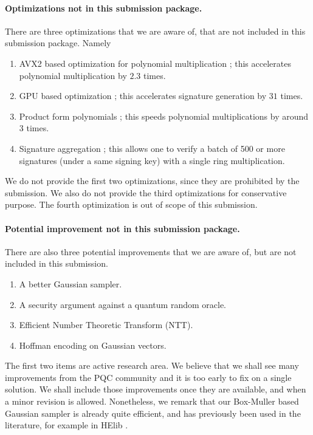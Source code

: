 \documentclass{llncs}
\newcommand{\<}{\langle}
\renewcommand{\>}{\rangle}
\begin{document}
\paragraph{Optimizations not in this submission package.}
There are three optimizations that we are aware of, that are not 
included in this submission package. Namely
\begin{enumerate}


\item AVX2 based optimization for polynomial multiplication \cite{ntrutoc}; this accelerates polynomial multiplication by $2.3$ times.
\item GPU based optimization \cite{DBLP:conf/ieeehpcs/DaiSSWZ16}; this 
accelerates signature generation by $31$ times.
\item Product form polynomials \cite{DBLP:conf/ctrsa/HoffsteinPSSWZ17}; this speeds 
polynomial multiplications by around 3 times.
\item Signature aggregation \cite{cryptoeprint:2017:995}; this allows one to verify a batch of 500 or more signatures
(under a same signing key) with a single ring multiplication.
\end{enumerate}
We do not provide the first two optimizations, since they are prohibited
by the submission. We also do not provide the third optimizations
for conservative purpose. The fourth optimization is out of scope of this
submission.

\paragraph{Potential improvement not in this submission package.} 
There are also three potential improvements that we are aware of, but
are not included in this submission.
\begin{enumerate}
\item A better Gaussian sampler.
\item A security argument against a quantum random oracle.
\item Efficient Number Theoretic Transform (NTT). 
\item Hoffman encoding on Gaussian vectors.
\end{enumerate}
The first two items are active research area. We believe that we shall
see many improvements from the PQC community and it is too early to fix
on a single solution. We shall include those improvements once they are
available, and when a minor revision is allowed. Nonetheless, we remark
that our Box-Muller based Gaussian sampler is already quite efficient, 
and has previously been used in the literature, for example in HElib \cite{DBLP:conf/crypto/HaleviS14}. 
\end{document}
